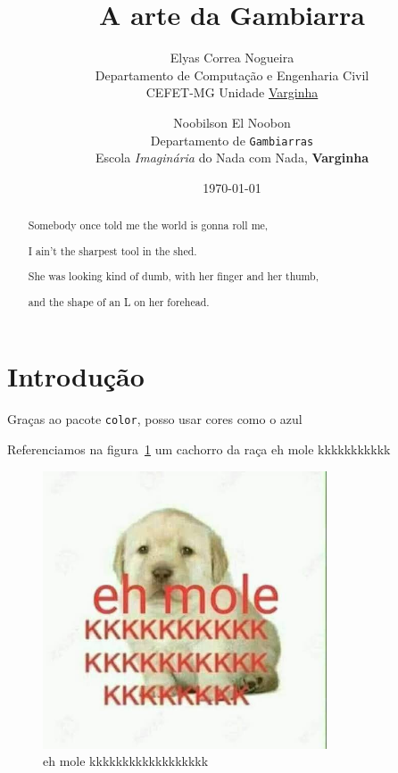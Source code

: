 \documentclass[12pt]{article}
\title{A arte da Gambiarra}
\author{
	Elyas Correa Nogueira\\
	Departamento de Computação e Engenharia Civil\\
	CEFET-MG Unidade \underline{Varginha}
	\and
	Noobilson El Noobon\\
	Departamento de \texttt{Gambiarras}\\
	Escola \textit{Imaginária} do Nada com Nada, \textbf{Varginha}
}
\date{\today}
\begin{document}
	
	\maketitle

	
	\begin{abstract}
		{\color{red} Somebody once told me the world is gonna roll me,}
		
		I ain't the sharpest tool in the shed.
		
		She was looking kind of dumb, with her finger and her thumb,
		
		and the shape of an L on her forehead.
	\end{abstract}


	\section{Introdução}
	
		Graças ao pacote \texttt{color}, posso usar cores como o {\color{blue}azul}
		
		Referenciamos na figura~\ref{mole} um cachorro da raça eh mole kkkkkkkkkkk
		
		\begin{figure}[h]
			\begin{center}
				\includegraphics[width=0.75\textwidth]{ehmole.jpg}
				\caption{eh mole kkkkkkkkkkkkkkkkkk}
				\label{mole}
			\end{center}
		\end{figure}
		
\end{document}
